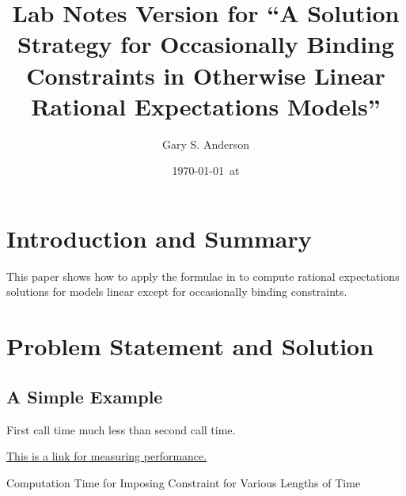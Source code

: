 \documentclass[12pt]{article}
\title{Lab Notes Version for ``A Solution Strategy for Occasionally Binding Constraints in Otherwise
Linear Rational Expectations Models''}
\author{Gary S. Anderson}
\date{\today \   at \currenttime}
\begin{document}
\maketitle




\section{Introduction and Summary}
\label{sec:introduction-summary}

This paper shows how to apply the formulae in\citep{anderson10} to compute 
rational expectations solutions for models linear except for occasionally binding constraints.

\section{Problem Statement and Solution}
\label{sec:probl-stat-solut}








\subsection{A Simple Example}
\label{sec:simple-example}


First call time much less than second call time.



\href{http://www.tecmint.com/command-line-tools-to-monitor-linux-performance/}{This is a link for measuring performance.}


    



\begin{table}

{\tiny     
\caption{Computation Time for Imposing Constraint for Various Lengths of Time}
\label{tab:varLen}
  \centering




}

\end{table}
\end{document}
